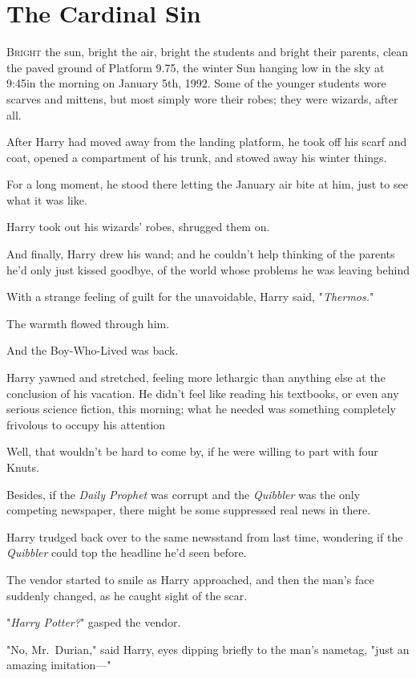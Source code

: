\chapter{The Cardinal Sin}

\lettrine{B}{right} the sun,
bright the air, bright the students and bright their parents, clean the paved
ground of Platform 9.75, the winter Sun hanging low in the sky at 9:45\AM in the
morning on January 5th, 1992. Some of the younger students wore scarves and
mittens, but most simply wore their robes; they were wizards, after all.

After Harry had moved away from the landing platform, he took off his scarf and
coat, opened a compartment of his trunk, and stowed away his winter things.

For a long moment, he stood there letting the January air bite at him, just to
see what it was like.

Harry took out his wizards' robes, shrugged them on.

And finally, Harry drew his wand; and he couldn't help thinking of the parents
he'd only just kissed goodbye, of the world whose problems he was leaving
behind{\el}

With a strange feeling of guilt for the unavoidable, Harry said,
"\emph{Thermos.}"

The warmth flowed through him.

And the Boy-Who-Lived was back.

Harry yawned and stretched, feeling more lethargic than anything else at the
conclusion of his vacation. He didn't feel like reading his textbooks, or even
any serious science fiction, this morning; what he needed was something
completely frivolous to occupy his attention{\el}

Well, that wouldn't be hard to come by, if he were willing to part with four
Knuts.

Besides, if the \emph{Daily Prophet} was corrupt and the \emph{Quibbler} was
the only competing newspaper, there might be some suppressed real news in there.

Harry trudged back over to the same newsstand from last time, wondering if the
\emph{Quibbler} could top the headline he'd seen before.

The vendor started to smile as Harry approached, and then the man's face
suddenly changed, as he caught sight of the scar.

"\emph{Harry Potter?}" gasped the vendor.

"No, Mr.~Durian," said Harry, eyes dipping briefly to the man's nametag, "just
an amazing imitation---"

